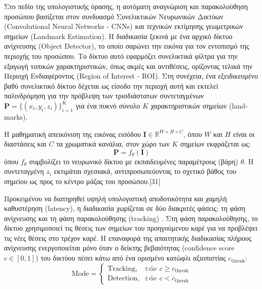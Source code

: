 \documentclass[twoside, a4paper, 11pt]{article}
\newcommand{\textlatin}[1]{\textenglish{#1}}
\begin{document}
Στο πεδίο της υπολογιστικής όρασης, η αυτόματη αναγνώριση και παρακολούθηση προσώπου 
βασίζεται στον συνδυασμό Συνελικτικών Νευρωνικών Δικτύων (\textlatin{Convolutional Neural Networks - CNNs}) και
 τεχνικών εκτίμησης γεωμετρικών σημείων (\textlatin{Landmark Estimation}). Η διαδικασία ξεκινά με ένα αρχικό δίκτυο ανίχνευσης
  (\textlatin{Object Detector}), το οποίο σαρώνει την εικόνα για τον εντοπισμό της περιοχής του προσώπου. 
  Το δίκτυο αυτό εφαρμόζει συνελικτικά φίλτρα για την εξαγωγή τοπικών χαρακτηριστικών, όπως ακμές και αντιθέσεις, 
  ορίζοντας τελικά την Περιοχή Ενδιαφέροντος (\textlatin{Region of Interest - ROI}). Στη συνέχεια, ένα εξειδικευμένο 
  βαθύ συνελικτικό δίκτυο δέχεται ως είσοδο την περιοχή αυτή και εκτελεί παλινδρόμηση για την πρόβλεψη των τρισδιάστατων 
  συντεταγμένων $\mathbf{P} = \{(x_i, y_i, z_i)\}_{i=1}^{K}$ για ένα πυκνό σύνολο $K$ χαρακτηριστικών σημείων (\textlatin{landmarks}).

Η μαθηματική απεικόνιση της εικόνας εισόδου $\mathbf{I} \in \mathbb{R}^{W \times H \times C}$, όπου $W$ και $H$ είναι οι διαστάσεις και $C$ τα χρωματικά κανάλια, στον χώρο των $K$ σημείων εκφράζεται ως:
\begin{equation}
\mathbf{P} = f_{\theta}(\mathbf{I})
\end{equation}
όπου $f_{\theta}$ συμβολίζει το νευρωνικό δίκτυο με εκπαιδευμένες παραμέτρους (βάρη) $\theta$. Η συντεταγμένη $z_i$ εκτιμάται σχεσιακά, αντιπροσωπεύοντας το σχετικό βάθος του σημείου ως προς το κέντρο μάζας του προσώπου.[31]

Προκειμένου να διατηρηθεί υψηλή υπολογιστική αποδοτικότητα και χαμηλή καθυστέρηση (\textlatin{latency}), η διαδικασία χωρίζεται σε δύο διακριτές φάσεις: τη φάση ανίχνευσης και τη φάση παρακολούθησης (\textlatin{tracking}) \cite{lugaresi2019mediapipe}. Στη φάση παρακολούθησης, το δίκτυο χρησιμοποιεί τις θέσεις των σημείων του προηγούμενου καρέ για να προβλέψει τις νέες θέσεις στο τρέχον καρέ. Η επαναφορά της απαιτητικής διαδικασίας πλήρους ανίχνευσης ενεργοποιείται μόνο όταν ο δείκτης βεβαιότητας (\textlatin{confidence score} $c \in [0,1]$) του δικτύου πέσει κάτω από ένα ορισμένο κατώφλι αξιοπιστίας $c_{\text{thresh}}$:
\begin{equation}
\text{Mode} = \begin{cases} 
\text{Tracking}, & \text{εάν } c \ge c_{\text{thresh}} \\ 
\text{Detection}, & \text{εάν } c < c_{\text{thresh}} 
\end{cases}
\end{equation}
\end{document}
